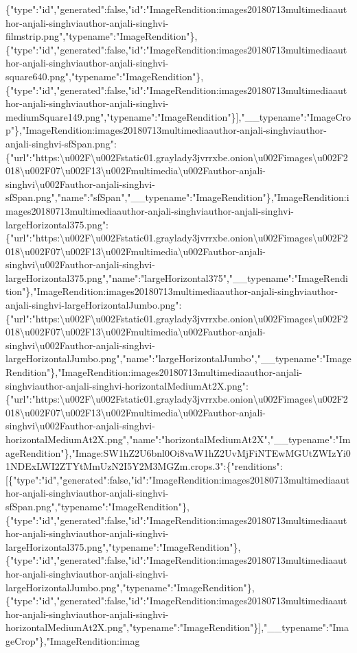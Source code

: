 \{"type":"id","generated":false,"id":"ImageRendition:images20180713multimediaauthor-anjali-singhviauthor-anjali-singhvi-filmstrip.png","typename":"ImageRendition"\},\{"type":"id","generated":false,"id":"ImageRendition:images20180713multimediaauthor-anjali-singhviauthor-anjali-singhvi-square640.png","typename":"ImageRendition"\},\{"type":"id","generated":false,"id":"ImageRendition:images20180713multimediaauthor-anjali-singhviauthor-anjali-singhvi-mediumSquare149.png","typename":"ImageRendition"\}{]},"\_\_typename":"ImageCrop"\},"ImageRendition:images20180713multimediaauthor-anjali-singhviauthor-anjali-singhvi-sfSpan.png":\{"url":"https:\textbackslash{}u002F\textbackslash{}u002Fstatic01.graylady3jvrrxbe.onion\textbackslash{}u002Fimages\textbackslash{}u002F2018\textbackslash{}u002F07\textbackslash{}u002F13\textbackslash{}u002Fmultimedia\textbackslash{}u002Fauthor-anjali-singhvi\textbackslash{}u002Fauthor-anjali-singhvi-sfSpan.png","name":"sfSpan","\_\_typename":"ImageRendition"\},"ImageRendition:images20180713multimediaauthor-anjali-singhviauthor-anjali-singhvi-largeHorizontal375.png":\{"url":"https:\textbackslash{}u002F\textbackslash{}u002Fstatic01.graylady3jvrrxbe.onion\textbackslash{}u002Fimages\textbackslash{}u002F2018\textbackslash{}u002F07\textbackslash{}u002F13\textbackslash{}u002Fmultimedia\textbackslash{}u002Fauthor-anjali-singhvi\textbackslash{}u002Fauthor-anjali-singhvi-largeHorizontal375.png","name":"largeHorizontal375","\_\_typename":"ImageRendition"\},"ImageRendition:images20180713multimediaauthor-anjali-singhviauthor-anjali-singhvi-largeHorizontalJumbo.png":\{"url":"https:\textbackslash{}u002F\textbackslash{}u002Fstatic01.graylady3jvrrxbe.onion\textbackslash{}u002Fimages\textbackslash{}u002F2018\textbackslash{}u002F07\textbackslash{}u002F13\textbackslash{}u002Fmultimedia\textbackslash{}u002Fauthor-anjali-singhvi\textbackslash{}u002Fauthor-anjali-singhvi-largeHorizontalJumbo.png","name":"largeHorizontalJumbo","\_\_typename":"ImageRendition"\},"ImageRendition:images20180713multimediaauthor-anjali-singhviauthor-anjali-singhvi-horizontalMediumAt2X.png":\{"url":"https:\textbackslash{}u002F\textbackslash{}u002Fstatic01.graylady3jvrrxbe.onion\textbackslash{}u002Fimages\textbackslash{}u002F2018\textbackslash{}u002F07\textbackslash{}u002F13\textbackslash{}u002Fmultimedia\textbackslash{}u002Fauthor-anjali-singhvi\textbackslash{}u002Fauthor-anjali-singhvi-horizontalMediumAt2X.png","name":"horizontalMediumAt2X","\_\_typename":"ImageRendition"\},"Image:SW1hZ2U6bnl0Oi8vaW1hZ2UvMjFiNTEwMGUtZWIzYi01NDExLWI2ZTYtMmUzN2I5Y2M3MGZm.crops.3":\{"renditions":{[}\{"type":"id","generated":false,"id":"ImageRendition:images20180713multimediaauthor-anjali-singhviauthor-anjali-singhvi-sfSpan.png","typename":"ImageRendition"\},\{"type":"id","generated":false,"id":"ImageRendition:images20180713multimediaauthor-anjali-singhviauthor-anjali-singhvi-largeHorizontal375.png","typename":"ImageRendition"\},\{"type":"id","generated":false,"id":"ImageRendition:images20180713multimediaauthor-anjali-singhviauthor-anjali-singhvi-largeHorizontalJumbo.png","typename":"ImageRendition"\},\{"type":"id","generated":false,"id":"ImageRendition:images20180713multimediaauthor-anjali-singhviauthor-anjali-singhvi-horizontalMediumAt2X.png","typename":"ImageRendition"\}{]},"\_\_typename":"ImageCrop"\},"ImageRendition:imag